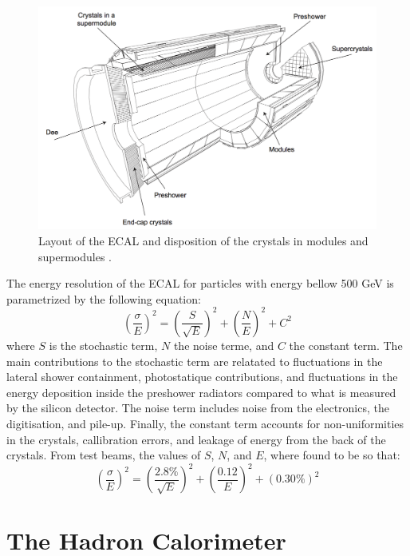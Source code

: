     \begin{figure}[h!]
      \centering
      \includegraphics[width=\textwidth]{img/I-3-cms/ecal.png}
      \caption{Layout of the ECAL and disposition of the crystals in modules and supermodules \cite{1748-0221-3-08-S08004}.}
      \label{fig:I-3-ecal}
    \end{figure}

    The energy resolution of the ECAL for particles with energy bellow 500 GeV is parametrized by the following equation:
    \begin{equation}
      \left( \frac{\sigma}{E} \right)^2 = \left( \frac{S}{\sqrt{E}} \right)^2 + \left( \frac{N}{E} \right)^2 + C^2
    \end{equation}
    where $ S $ is the stochastic term, $ N $ the noise terme, and $ C $ the constant term. The main contributions to the stochastic term are relatated to fluctuations in the lateral shower containment, photostatique contributions, and fluctuations in the energy deposition inside the preshower radiators compared to what is measured by the silicon detector. The noise term includes noise from the electronics, the digitisation, and pile-up. Finally, the constant term accounts for non-uniformities in the crystals, callibration errors, and leakage of energy from the back of the crystals. From test beams, the values of $ S $, $ N $, and $ E $, where found to be so that: \\
    \begin{equation}
      \left( \frac{\sigma}{E} \right)^2 = \left( \frac{2.8\%}{\sqrt{E}} \right)^2 + \left( \frac{0.12}{E} \right)^2 + (0.30\%)^2
    \end{equation}

  \section{The Hadron Calorimeter}

